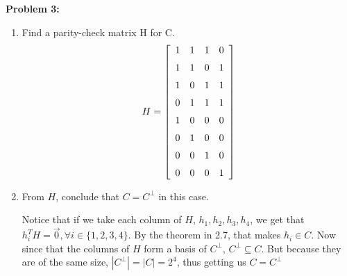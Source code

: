 \documentclass[11pt]{article}
\newcommand{\skipline}{\vspace{\baselineskip}}
\newenvironment{problem}[1]{\textbf{Problem #1: }}{\newpage}
\begin{document}
\begin{problem}{3}
\begin{enumerate}[label = (\alph*)]
			\item Find a parity-check matrix H for C.
			\[H = \left[\begin{array}{cccc}
				1&1&1&0 \\
				\noalign{\medskip} 1&1&0&1 \\
				\noalign{\medskip} 1&0&1&1 \\
				\noalign{\medskip} 0&1&1&1 \\
				\noalign{\medskip} 1&0&0&0 \\
				\noalign{\medskip} 0&1&0&0 \\
				\noalign{\medskip} 0&0&1&0 \\
				\noalign{\medskip} 0&0&0&1 \\
			\end{array}\right]\]
			\item From $H$, conclude that $C = C^\perp$ in this case.

			\skipline 
			Notice that if we take each column of $H$, $h_1, h_2, h_3, h_4$, we get that $h_i^T H = \vec{0}, \forall i \in \{1,2,3,4\}$.  By the theorem in 2.7, that makes $h_i \in C$.  Now since that the columns of $H$ form a basis of $C^\perp$, $C^\perp \subseteq C$.  But because they are of the same size, $|C^\perp| = |C| = 2^4$, thus getting us $C = C^\perp$
		\end{enumerate}
	\end{problem}
\end{document}
